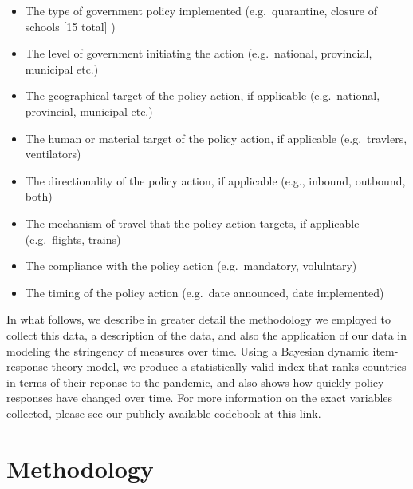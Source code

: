 \documentclass[]{article}
\providecommand{\tightlist}{%
  \setlength{\itemsep}{0pt}\setlength{\parskip}{0pt}}
\begin{document}
\begin{itemize}
\tightlist
\item
  The type of government policy implemented (e.g.~quarantine, closure of schools {[}15 total{]} )
\item
  The level of government initiating the action (e.g.~national, provincial, municipal etc.)
\item
  The geographical target of the policy action, if applicable (e.g.~national, provincial, municipal etc.)
\item
  The human or material target of the policy action, if applicable (e.g.~travlers, ventilators)
\item
  The directionality of the policy action, if applicable (e.g., inbound, outbound, both)
\item
  The mechanism of travel that the policy action targets, if applicable (e.g.~flights, trains)
\item
  The compliance with the policy action (e.g.~mandatory, volulntary)
\item
  The timing of the policy action (e.g.~date announced, date implemented)
\end{itemize}

In what follows, we describe in greater detail the methodology we employed to collect this data, a description of the data, and also the application of our data in modeling the stringency of measures over time. Using a Bayesian dynamic item-response theory model, we produce a statistically-valid index that ranks countries in terms of their reponse to the pandemic, and also shows how quickly policy responses have changed over time. For more information on the exact variables collected, please see our publicly available codebook \href{https://docs.google.com/document/d/1zvNMpwj0onFvUZ_gLl4RRjqS-clbHv3TIX6EOHofsME/edit?usp=sharing}{at this link}.

\hypertarget{methodology}{%
\section{Methodology}\label{methodology}}
\end{document}
